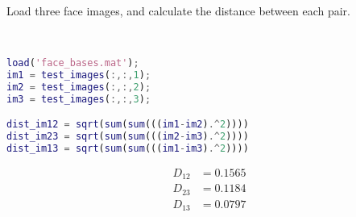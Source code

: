 Load three face images, and calculate the distance between each pair.

\begin{solution} \
    \begin{lstlisting}[language=Matlab]
load('face_bases.mat');
im1 = test_images(:,:,1);
im2 = test_images(:,:,2);
im3 = test_images(:,:,3);

dist_im12 = sqrt(sum(sum(((im1-im2).^2))))
dist_im23 = sqrt(sum(sum(((im2-im3).^2))))
dist_im13 = sqrt(sum(sum(((im1-im3).^2))))
    \end{lstlisting}
    
    \begin{align*}
        D_{12} &= 0.1565 \\
        D_{23} &= 0.1184 \\
        D_{13} &= 0.0797 \\
    \end{align*}
\end{solution}